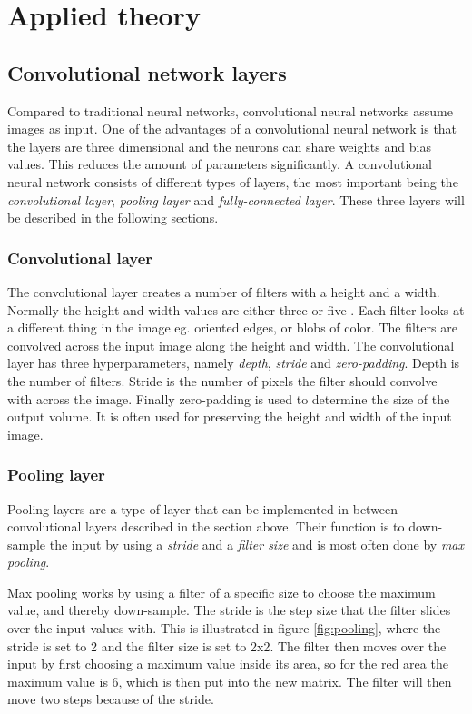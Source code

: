 \chapter{Applied theory}
\label{chp:theory}

\section{Convolutional network layers}
Compared to traditional neural networks, convolutional neural networks assume images as input. One of the advantages of a convolutional neural network is that the layers are three dimensional and the neurons can share weights and bias values. This reduces the amount of parameters significantly. A convolutional neural network consists of different types of layers, the most important being the \emph{convolutional layer}, \emph{pooling layer} and \emph{fully-connected layer}. These three layers will be described in the following sections.

\subsection{Convolutional layer}
The convolutional layer creates a number of filters with a height and a width. Normally the height and width values are either three or five \citep{FCL}. Each filter looks at a different thing in the image eg. oriented edges, or blobs of color. The filters are convolved across the input image along the height and width. The convolutional layer has three hyperparameters, namely \emph{depth}, \emph{stride} and \emph{zero-padding}. Depth is the number of filters. Stride is the number of pixels the filter should convolve with across the image. Finally zero-padding is used to determine the size of the output volume. It is often used for preserving the height and width of the input image. 

\subsection{Pooling layer}
Pooling layers are a type of layer that can be implemented in-between convolutional layers described in the section above. Their function is to down-sample the input by using a \emph{stride} and a \emph{filter size} and is most often done by \emph{max pooling}. 

Max pooling works by using a filter of a specific size to choose the maximum value, and thereby down-sample. The stride is the step size that the filter slides over the input values with. This is illustrated in figure \ref{fig:pooling}, where the stride is set to 2 and the filter size is set to 2x2. The filter then moves over the input by first choosing a maximum value inside its area, so for the red area the maximum value is 6, which is then put into the new matrix. The filter will then move two steps because of the stride. 

